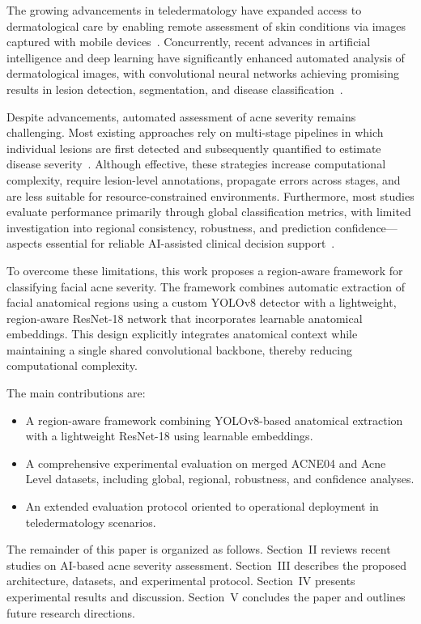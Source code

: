 \documentclass[conference]{IEEEtran}
\begin{document}
The growing advancements in teledermatology have expanded access to dermatological care by enabling remote assessment of skin conditions via images captured with mobile devices~\cite{lenuta2025,heng2020}. Concurrently, recent advances in artificial intelligence and deep learning have significantly enhanced automated analysis of dermatological images, with convolutional neural networks achieving promising results in lesion detection, segmentation, and disease classification~\cite{layton2025,samuels2020}.

Despite advancements, automated assessment of acne severity remains challenging. Most existing approaches rely on multi-stage pipelines in which individual lesions are first detected and subsequently quantified to estimate disease severity~\cite{layton2021,morshed2023,tasneem2023}. Although effective, these strategies increase computational complexity, require lesion-level annotations, propagate errors across stages, and are less suitable for resource-constrained environments. Furthermore, most studies evaluate performance primarily through global classification metrics, with limited investigation into regional consistency, robustness, and prediction confidence---aspects essential for reliable AI-assisted clinical decision support~\cite{eichenfield2021,wongvibulsin2024,reynolds2024}.

To overcome these limitations, this work proposes a region-aware framework for classifying facial acne severity. The framework combines automatic extraction of facial anatomical regions using a custom YOLOv8 detector with a lightweight, region-aware ResNet-18 network that incorporates learnable anatomical embeddings. This design explicitly integrates anatomical context while maintaining a single shared convolutional backbone, thereby reducing computational complexity.

The main contributions are:
\begin{itemize}
\item A region-aware framework combining YOLOv8-based anatomical extraction with a lightweight ResNet-18 using learnable embeddings.
\item A comprehensive experimental evaluation on merged ACNE04 and Acne Level datasets, including global, regional, robustness, and confidence analyses.
\item An extended evaluation protocol oriented to operational deployment in teledermatology scenarios.
\end{itemize}

The remainder of this paper is organized as follows. Section~II reviews recent studies on AI-based acne severity assessment. Section~III describes the proposed architecture, datasets, and experimental protocol. Section~IV presents experimental results and discussion. Section~V concludes the paper and outlines future research directions.
\end{document}
